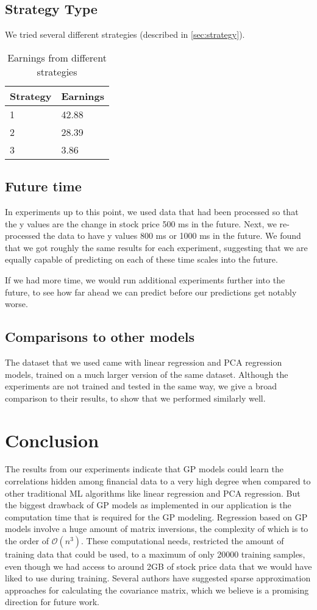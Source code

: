 \documentclass{article} %
\begin{document}
\subsection{Strategy Type}
We tried several different strategies (described in \ref{sec:strategy}).
\begin{table}[h]
	\label{t:miss}
	\centering
	\caption{Earnings from different strategies}
	\begin{tabular}{| l | l |}
	\hline
	Strategy & Earnings \\
	\hline
	1 & 42.88 \\
	2 & 28.39 \\
	3 & 3.86 \\
	\hline
	\end{tabular}
\end{table}


\subsection{Future time}
In experiments up to this point, we used data that had been processed so that the y values are the change in stock price 500 ms in the future.
Next, we re-processed the data to have y values 800 ms or 1000 ms in the future.
We found that we got roughly the same results for each experiment, suggesting that we are equally capable of predicting on each of these time scales into the future.

If we had more time, we would run additional experiments further into the future, to see how far ahead we can predict before our predictions get notably worse.


\subsection{Comparisons to other models}
The dataset that we used came with linear regression and PCA regression models, trained on a much larger version of the same dataset.
Although the experiments are not trained and tested in the same way, we give a broad comparison to their results, to show that we performed similarly well.

\section{Conclusion}
The results from our experiments indicate that GP models could learn the correlations hidden among financial data to a very high degree when compared to other traditional ML algorithms like linear regression and PCA regression. But the biggest drawback of GP models as implemented in our application is the computation time that is required for the GP modeling. Regression based on GP models involve a huge amount of matrix inversions, the complexity of which is to the order of $\mathcal{O}(n^3)$. These computational needs, restricted the amount of training data that could be used, to a maximum of only 20000 training samples, even though we had access to around 2GB of stock price data that we would have liked to use during training. Several authors have suggested sparse approximation approaches for calculating the covariance matrix, which we believe is a promising direction for future work. 
\end{document}
